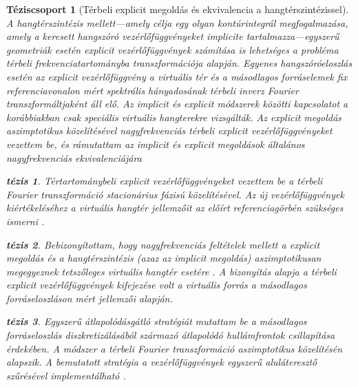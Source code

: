 \documentclass[10pt,twoside]{article}
\theoremstyle{thesisgroupstyle}
\newtheorem{thesisgroup}{Téziscsoport}
\theoremstyle{indented}
\newtheorem{thesis}{tézis}[thesisgroup]
\begin{document}
\begin{thesisgroup}[Térbeli explicit megoldás és ekvivalencia a hangtérszintézissel]
A hangtérszintézis mellett---amely célja egy olyan kontúrintegrál megfogalmazása, amely a keresett hangszóró vezérlőfüggvényeket implicite tartalmazza---egyszerű geometriák esetén explicit vezérlőfüggvények számítása is lehetséges a probléma térbeli frekvenciatartományba transzformációja alapján.
Egyenes hangszóróeloszlás esetén az explicit vezérlőfüggvény a virtuális tér és a másodlagos forráselemek fix referenciavonalon mért spektrális hányadosának térbeli inverz Fourier transzformáltjaként áll elő.
Az implicit és explicit módszerek közötti kapcsolatot a korábbiakban csak speciális virtuális hangterekre vizsgálták.
Az explicit megoldás aszimptotikus közelítésével nagyfrekvenciás térbeli explicit vezérlőfüggvényeket vezettem be, és rámutattam az implicit és explicit megoldások általános nagyfrekvenciás ekvivalenciájára \cite{Firtha2017:daga_booklet, Firtha2018:WFS_vs_SDM_booklet}
\begin{thesis}
Tértartománybeli explicit vezérlőfüggvényeket vezettem be a térbeli Fourier transzformáció stacionárius fázisú közelítésével.
Az új vezérlőfüggvények kiértékeléséhez a virtuális hangtér jellemzőit az előírt referenciagörbén szükséges ismerni \cite{Firtha2017:daga_booklet}.\end{thesis}
\begin{thesis}
Bebizonyítottam, hogy nagyfrekvenciás feltételek mellett a explicit megoldás és a hangtérszintézis (azaz az implicit megoldás) aszimptotikusan megegyeznek tetszőleges virtuális hangtér esetére \cite{Firtha2018:WFS_vs_SDM_booklet}.
A bizonyítás alapja a térbeli explicit vezérlőfüggvények kifejezése volt a virtuális forrás a másodlagos forráseloszláson mért jellemzői alapján.
\end{thesis}
\begin{thesis}
Egyszerű átlapolódásgátló stratégiát mutattam be a másodlagos forráseloszlás diszkretizálásából származó átlapolódó hullámfrontok csillapítása érdekében.
A módszer a térbeli Fourier transzformáció aszimptotikus közelítésén alapszik.
A bemutatott stratégia a vezérlőfüggvények egyszerű aluláteresztő szűrésével implementálható \cite{Firtha2018_daga_a_booklet}.
\end{thesis}
\end{thesisgroup}
\end{document}
